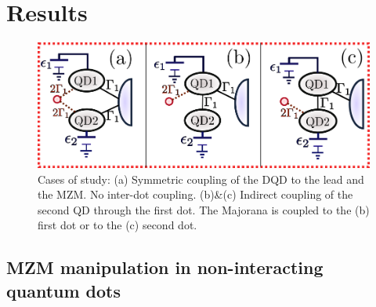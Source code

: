 \documentclass[showpacs,aps,prb,reprint,superscriptaddress]{revtex4-1}
\begin{document}
 \section{Results}
\begin{figure}[bt]
\begin{center}
\includegraphics[scale=0.5]{Graficos/MajoranaModels.png}
\caption{\label{fig:MajoranaModels}  Cases of study: (a) Symmetric coupling of the DQD to the lead and the MZM. No inter-dot coupling. (b)\&(c) Indirect coupling of the second QD through the first dot. The Majorana is coupled to the (b) first dot or to the (c) second dot. 
}
%
\end{center}
\end{figure}

     \subsection{MZM manipulation in non-interacting quantum dots}
\end{document}
